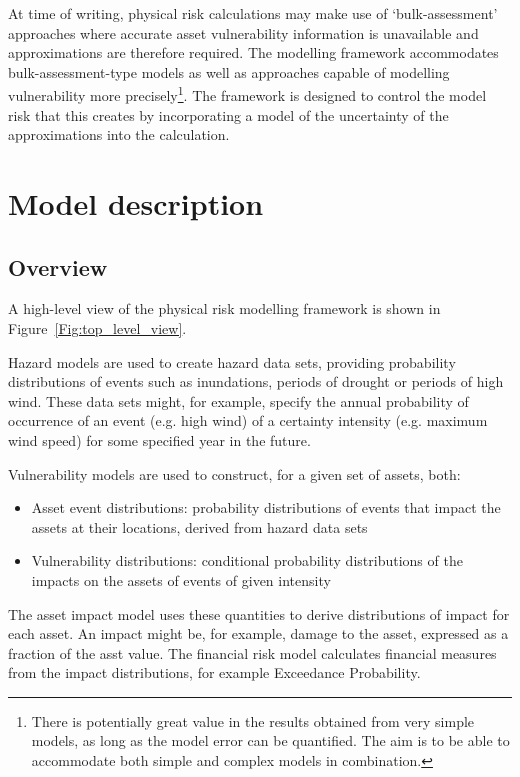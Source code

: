 \documentclass[a4paper,11pt]{extarticle} %
\begin{document}
At time of writing, physical risk calculations may make use of `bulk-assessment' approaches where accurate asset vulnerability information is unavailable and approximations are therefore required. The modelling framework accommodates bulk-assessment-type models as well as approaches capable of modelling vulnerability more precisely\footnote{There is potentially great value in the results obtained from very simple models, as long as the model error can be quantified. The aim is to be able to accommodate both simple and complex models in combination.}. The framework is designed to control the model risk that this creates by incorporating a model of the uncertainty of the approximations into the calculation.


\section{Model description}

\subsection{Overview}
A high-level view of the physical risk modelling framework is shown in Figure~\ref{Fig:top_level_view}.

Hazard models are used to create hazard data sets, providing probability distributions of events such as inundations, periods of drought or periods of high wind. These data sets might, for example, specify the annual probability of occurrence of an event (e.g. high wind) of a certainty intensity (e.g. maximum wind speed) for some specified year in the future.

Vulnerability models are used to construct, for a given set of assets, both:
\begin{itemize}
    \item Asset event distributions: probability distributions of events that impact the assets at their locations, derived from hazard data sets
    \item Vulnerability distributions: conditional probability distributions of the impacts on the assets of events of given intensity
\end{itemize}

The asset impact model uses these quantities to derive distributions of impact for each asset. An impact might be, for example, damage to the asset, expressed as a fraction of the asst value. The financial risk model calculates financial measures from the impact distributions, for example Exceedance Probability.
\end{document}
